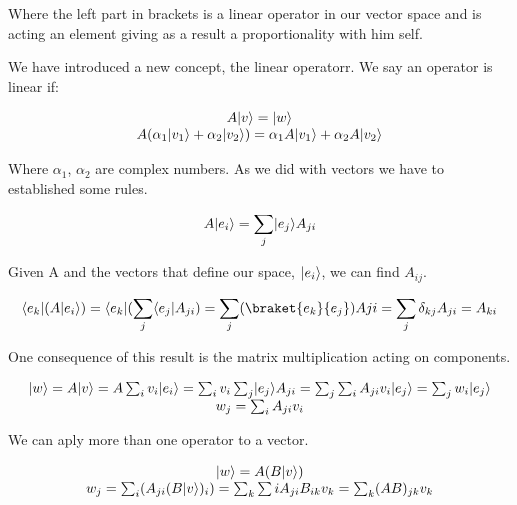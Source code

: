 Where the left part in brackets is a linear operator in our vector space and is acting an element giving as a result a proportionality with him self.

We have introduced a new concept, the linear operatorr. We say an operator is linear if:

\begin{equation}
  \label{6.14}
  \begin{array}{c}
    A \lvert v\rangle = \lvert w\rangle \\
    A(\alpha_1 \lvert v_1\rangle+\alpha_2\lvert v_2\rangle) = \alpha_1 A \lvert v_1\rangle + \alpha_2 A \lvert v_2\rangle
  \end{array}
\end{equation}

Where $\alpha_1$, $\alpha_2$ are complex numbers. As we did with vectors we have to established some rules.

\begin{equation}
  \label{6.15}
  A \lvert e_i\rangle = \sum_{j} \lvert e_j\rangle A_{ji}
\end{equation}

Given A and the vectors that define our space, $\lvert e_i\rangle$, we can find $A_{ij}$.

\begin{equation}
  \label{6.16}
  \bra{e_k}(A \ket{e_i}) =\bra{e_k}(\sum_{j}\bra{e_j}A_{ji}) = \sum_{j} (\braket{e_k}{e_j})Aji = \sum_{j}\delta_{kj}A_{ji}=A_{ki}
\end{equation}

One consequence of this result is the matrix multiplication acting on components.

\begin{equation}
  \label{6.17}
  \begin{array}{c}
    \lvert w\rangle = A \lvert v\rangle = A \sum_{i} v_i\lvert e_i\rangle = \sum_{i} v_i\sum_{j}\lvert e_j\rangle A_{ji} = \sum_j\sum_i A_{ji} v_i \lvert e_j\rangle = \sum_{j} w_i \lvert e_j\rangle\\
    w_j = \sum_{i}A_{ji} v_i
  \end{array}
\end{equation}

We can aply more than one operator to a vector.

\begin{equation}
  \label{6.18}
  \begin{array}{c}
    \lvert w\rangle = A(B \lvert v\rangle) \\
    w_j = \sum_{i}(A_{ji}(B\lvert v\rangle)_i) = \sum_{k}\sum{i}A_{ji}B_{ik}v_k = \sum_{k} (AB)_{jk} v_k
  \end{array}
\end{equation}


